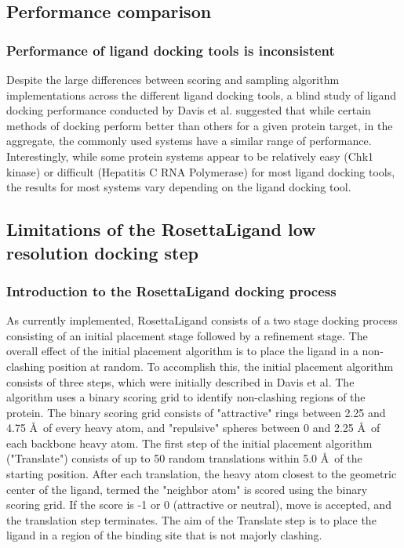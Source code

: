 \subsection{Performance comparison}

\subsubsection{Performance of ligand docking tools is inconsistent} 
Despite the large differences between scoring and sampling algorithm implementations across the different ligand docking tools, a blind study of ligand docking performance conducted by Davis et al. \citep{Davis:2009fx} suggested that while certain methods of docking perform better than others for a given protein target, in the aggregate, the commonly used systems have a similar range of performance.
Interestingly, while some protein systems appear to be relatively easy (Chk1 kinase) or difficult (Hepatitis C RNA Polymerase) for most ligand docking tools, the results for most systems vary depending on the ligand docking tool.

\subsection{Limitations of the RosettaLigand low resolution docking step}

\subsubsection{Introduction to the RosettaLigand docking process}
As currently implemented, RosettaLigand consists of a two stage docking process consisting of an initial placement stage followed by a refinement stage.
The overall effect of the initial placement algorithm is to place the ligand in a non-clashing position at random.
To accomplish this, the initial placement algorithm consists of three steps, which were initially described in Davis et al. \citep{Davis:2009bf}
The algorithm uses a binary scoring grid to identify non-clashing regions of the protein.
The binary scoring grid consists of "attractive" rings between 2.25 and 4.75 \AA\ of every heavy atom, and "repulsive" spheres between 0 and 2.25 \AA\ of each backbone heavy atom. 
The first step of the initial placement algorithm ("Translate") consists of up to 50 random translations within 5.0 \AA\ of the starting position.
After each translation, the heavy atom closest to the geometric center of the ligand, termed the "neighbor atom" is scored using the binary scoring grid.
If the score is -1 or 0 (attractive or neutral), move is accepted, and the translation step terminates.
The aim of the Translate step is to place the ligand in a region of the binding site that is not majorly clashing.

